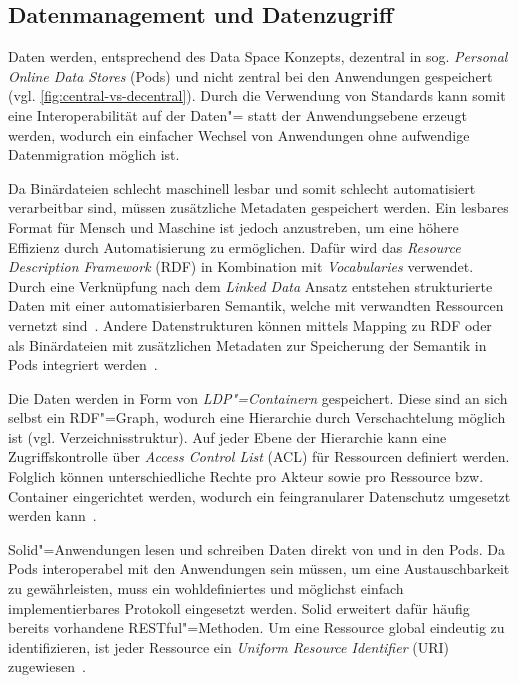 \subsection{Datenmanagement und Datenzugriff}

Daten werden, entsprechend des Data Space Konzepts, dezentral in sog. \emph{Personal Online Data Stores} (Pods) und nicht zentral bei den Anwendungen gespeichert~\cite{mecklerWebLinkedData2023} (vgl. \autoref{fig:central-vs-decentral}).
Durch die Verwendung von Standards kann somit eine Interoperabilität auf der Daten"= statt der Anwendungsebene erzeugt werden, wodurch ein einfacher Wechsel von Anwendungen ohne aufwendige Datenmigration möglich ist.

Da Binärdateien schlecht maschinell lesbar und somit schlecht automatisiert verarbeitbar sind, müssen zusätzliche Metadaten gespeichert werden.
Ein lesbares Format für Mensch und Maschine ist jedoch anzustreben, um eine höhere Effizienz durch Automatisierung zu ermöglichen.
Dafür wird das \emph{Resource Description Framework} (RDF) in Kombination mit \emph{Vocabularies} verwendet.
Durch eine Verknüpfung nach dem \emph{Linked Data} Ansatz entstehen strukturierte Daten mit einer automatisierbaren Semantik, welche mit verwandten Ressourcen vernetzt sind~\cite{bizerLinkedDataStory2009,mecklerWebLinkedData2023,sambraSolidPlatformDecentralized2016}.
Andere Datenstrukturen können mittels Mapping zu RDF oder als Binärdateien mit zusätzlichen Metadaten zur Speicherung der Semantik in Pods integriert werden~\cite{mecklerWebLinkedData2023,sambraSolidPlatformDecentralized2016}.

Die Daten werden in Form von \emph{LDP"=Containern} gespeichert.
Diese sind an sich selbst ein RDF"=Graph, wodurch eine Hierarchie durch Verschachtelung möglich ist (vgl. Verzeichnisstruktur).
Auf jeder Ebene der Hierarchie kann eine Zugriffskontrolle über \emph{Access Control List} (ACL) für Ressourcen definiert werden.
Folglich können unterschiedliche Rechte pro Akteur sowie pro Ressource bzw. Container eingerichtet werden, wodurch ein feingranularer Datenschutz umgesetzt werden kann~\cite{mecklerWebLinkedData2023,sambraSolidPlatformDecentralized2016}.

Solid"=Anwendungen lesen und schreiben Daten direkt von und in den Pods.
Da Pods interoperabel mit den Anwendungen sein müssen, um eine Austauschbarkeit zu gewährleisten, muss ein wohldefiniertes und möglichst einfach implementierbares Protokoll eingesetzt werden.
Solid erweitert dafür häufig bereits vorhandene RESTful"=Methoden.
Um eine Ressource global eindeutig zu identifizieren, ist jeder Ressource ein \emph{Uniform Resource Identifier} (URI) zugewiesen~\cite{mecklerWebLinkedData2023,sambraSolidPlatformDecentralized2016}.


